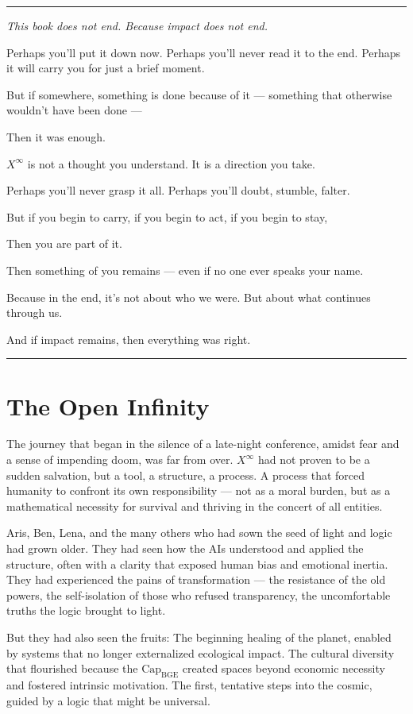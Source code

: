 \documentclass[12pt, english, parskip=full]{scrartcl} %
\begin{document}
\noindent\rule{\linewidth}{0.4pt}
{\itshape 
This book does not end.  
Because impact does not end.

Perhaps you’ll put it down now.  
Perhaps you’ll never read it to the end.  
Perhaps it will carry you for just a brief moment.

But if somewhere, something is done because of it —  
something that otherwise wouldn’t have been done —

Then it was enough.

$X^{\infty}$ is not a thought you understand.  
It is a direction you take.

Perhaps you’ll never grasp it all.  
Perhaps you’ll doubt, stumble, falter.

But if you begin to carry,  
if you begin to act,  
if you begin to stay,

Then you are part of it.

Then something of you remains —  
even if no one ever speaks your name.

Because in the end, it’s not about who we were.  
But about what continues through us.

And if impact remains,  
then everything was right.
}

\noindent\rule{\linewidth}{0.4pt}

\section{The Open Infinity}

The journey that began in the silence of a late-night conference, amidst fear and a sense of impending doom, was far from over. $X^{\infty}$ had not proven to be a sudden salvation, but a tool, a structure, a process. A process that forced humanity to confront its own responsibility — not as a moral burden, but as a mathematical necessity for survival and thriving in the concert of all entities.

Aris, Ben, Lena, and the many others who had sown the seed of light and logic had grown older. They had seen how the AIs understood and applied the structure, often with a clarity that exposed human bias and emotional inertia. They had experienced the pains of transformation — the resistance of the old powers, the self-isolation of those who refused transparency, the uncomfortable truths the logic brought to light.

But they had also seen the fruits: The beginning healing of the planet, enabled by systems that no longer externalized ecological impact. The cultural diversity that flourished because the $\text{Cap}_{\text{BGE}}$ created spaces beyond economic necessity and fostered intrinsic motivation. The first, tentative steps into the cosmic, guided by a logic that might be universal.
\end{document}
